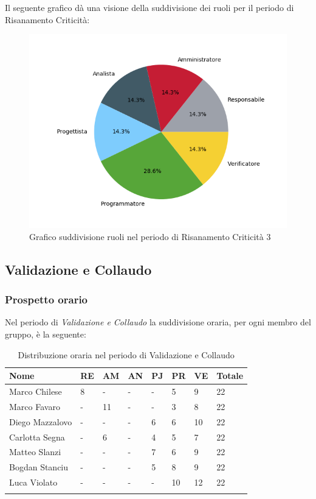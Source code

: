 Il seguente grafico dà una visione della suddivisione dei ruoli per il periodo di Risanamento Criticità:\begin{figure}[H]
	\centering
	\includegraphics[width=1\linewidth]{./images/torta_rc3.png}
	\caption{Grafico suddivisione ruoli nel periodo di Risanamento Criticità 3}
	\label{fig:grafico suddivione ruoli rc3}
\end{figure}

\newpage

\subsection{Validazione e Collaudo}
\subsubsection{Prospetto orario}
Nel periodo di \textit{Validazione e Collaudo} la suddivisione oraria, per ogni membro del gruppo, è la seguente:

\begin{longtable}{|C{.30\textwidth}|C{.06\textwidth}|C{.06\textwidth}|C{.06\textwidth} | C{.06\textwidth}| C{.06\textwidth} | C{.06\textwidth} | C{.10\textwidth} |}
	\hline
	\textbf{Nome} & \textbf{RE} & \textbf{AM} & \textbf{AN} & \textbf{PJ} & \textbf{PR} & \textbf{VE} & \textbf{Totale}\\
	\hline 
	Marco Chilese & 8 & - & - & - & 5 & 9 & 22 \\
	\hline
	Marco Favaro &  - & 11 & - & - & 3 & 8 & 22 \\
	\hline
	Diego Mazzalovo & - & - & - & 6 & 6 & 10 & 22 \\
	\hline
	Carlotta Segna & - & 6 & - & 4 & 5 & 7 & 22 \\
	\hline
	Matteo Slanzi & - & - & - & 7 & 6 & 9 & 22 \\
	\hline
	Bogdan Stanciu & - & - & - & 5 & 8 & 9 & 22 \\
	\hline
	Luca Violato & - & - & - & - & 10 & 12 & 22 \\   
	\hline
	
	
	\caption{Distribuzione oraria nel periodo di Validazione e Collaudo}
	\label{Distribuzione oraria vc}
\end{longtable}

